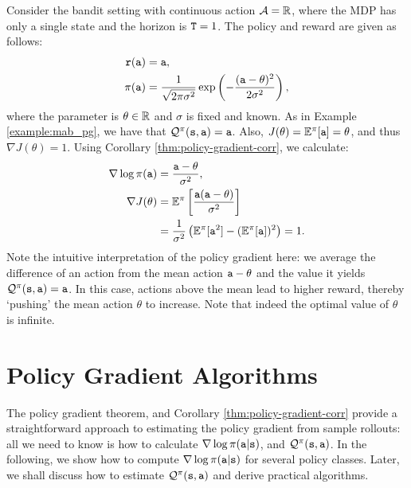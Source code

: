 \begin{example}\label{example:gaussian_bandit}
    Consider the bandit setting with continuous action $\mathcal{A} = \mathbb{R}$, where the MDP has only a single state and the horizon is ${\tt T}=1$. The policy and reward are given as follows:
\begin{equation*}
    \begin{split}
        {\tt r}({\tt a}) &= {\tt a}, \\
        \pi({\tt a}) &= \frac{1}{\sqrt{2 \pi \sigma^2}} \exp \left(- \frac{({\tt a} - \theta)^2}{2 \sigma^2}\right),
    \end{split}
\end{equation*}
where the parameter is $\theta\in\mathbb{R}$ and $\sigma$ is fixed and known.
As in Example \ref{example:mab_pg}, we have that $\mathcal{Q}^\pi({\tt s},{\tt a})={\tt a}$. 
Also, $J(\theta) = \mathbb{E}^{\pi}[{\tt a}] = \theta$, and thus $\nabla J(\theta) = 1.$
Using Corollary \ref{thm:policy-gradient-corr}, we calculate:
\begin{equation*}
    \begin{split}
        \nabla \log \pi({\tt a}) &= \frac{{\tt a} - \theta}{\sigma^2}, \\
        \nabla J(\theta) &= \mathbb{E}^{\pi} \left[\frac{{\tt a}({\tt a} - \theta)}{\sigma^2}\right] \\
        &= \frac{1}{\sigma^2} \left(\mathbb{E}^{\pi} [{\tt a}^2] - (\mathbb{E}^{\pi} [{\tt a}])^2\right) = 1.
    \end{split}
\end{equation*}
Note the intuitive interpretation of the policy gradient here: we average the difference of an action from the mean action ${\tt a}-\theta$ and the value it yields $\mathcal{Q}^\pi({\tt s},{\tt a})={\tt a}$. In this case, actions above the mean lead to higher reward, thereby `pushing' the mean action $\theta$ to increase. Note that indeed the optimal value of $\theta$ is infinite.
\end{example}

\section{Policy Gradient Algorithms}

The policy gradient theorem, and Corollary \ref{thm:policy-gradient-corr} provide a straightforward approach to estimating the policy gradient from sample rollouts: all we need to know is how to calculate $\nabla\log
\pi({\tt a}|{\tt s})$, and $\mathcal{Q}^\pi
({\tt s},{\tt a})$. In the following, we show how to compute $\nabla\log
\pi({\tt a}|{\tt s})$ for several policy classes. Later, we shall discuss how to estimate $\mathcal{Q}^\pi
({\tt s},{\tt a})$ and derive practical algorithms.

